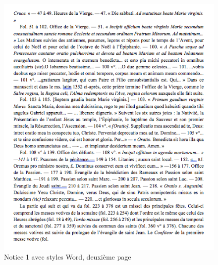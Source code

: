 \documentclass[a4paper,12pt,twoside]{book}
\begin{document}
    \begin{figure}[!h]
    \centering
    \includegraphics[width=15cm]{img/Doc_Sources_transformation/Docs_Word_Styles/Notice1/StylesNotice1_2.png}
    \caption{Notice 1 avec styles Word, deuxième page}
    \end{figure}
    \clearpage
    
\end{document}

